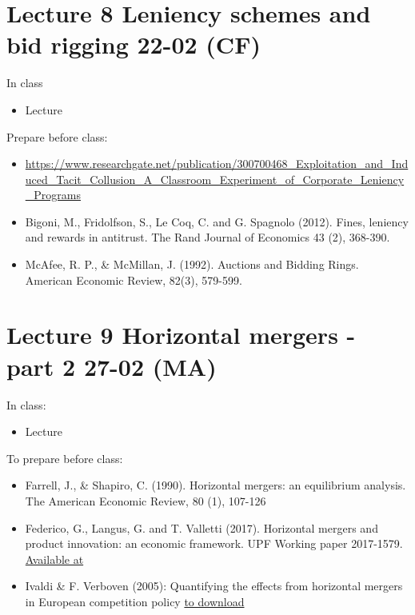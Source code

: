 \documentclass[]{book}
\providecommand{\tightlist}{%
  \setlength{\itemsep}{0pt}\setlength{\parskip}{0pt}}
\begin{document}
\section{Lecture 8 Leniency schemes and bid rigging 22-02
(CF)}\label{lecture-8-leniency-schemes-and-bid-rigging-22-02-cf}

In class

\begin{itemize}
\tightlist
\item
  Lecture
\end{itemize}

Prepare before class:

\begin{itemize}
\tightlist
\item
  \url{https://www.researchgate.net/publication/300700468_Exploitation_and_Induced_Tacit_Collusion_A_Classroom_Experiment_of_Corporate_Leniency_Programs}
\item
  Bigoni, M., Fridolfson, S., Le Coq, C. and G. Spagnolo (2012). Fines,
  leniency and rewards in antitrust. The Rand Journal of Economics 43
  (2), 368-390.
\item
  McAfee, R. P., \& McMillan, J. (1992). Auctions and Bidding Rings.
  American Economic Review, 82(3), 579-599.
\end{itemize}

\section{Lecture 9 Horizontal mergers - part 2 27-02
(MA)}\label{lecture-9-horizontal-mergers---part-2-27-02-ma}

In class:

\begin{itemize}
\tightlist
\item
  Lecture
\end{itemize}

To prepare before class:

\begin{itemize}
\tightlist
\item
  Farrell, J., \& Shapiro, C. (1990). Horizontal mergers: an equilibrium
  analysis. The American Economic Review, 80 (1), 107-126
\item
  Federico, G., Langus, G. and T. Valletti (2017). Horizontal mergers
  and product innovation: an economic framework. UPF Working paper
  2017-1579.
  \href{https://papers.ssrn.com/sol3/papers.cfm?abstract_id=2999178M}{Available
  at}
\item
  Ivaldi \& F. Verboven (2005): Quantifying the effects from horizontal
  mergers in European competition policy
  \href{https://ideas.repec.org/p/cpr/ceprdp/2697.html}{to download}
\end{itemize}
\end{document}
